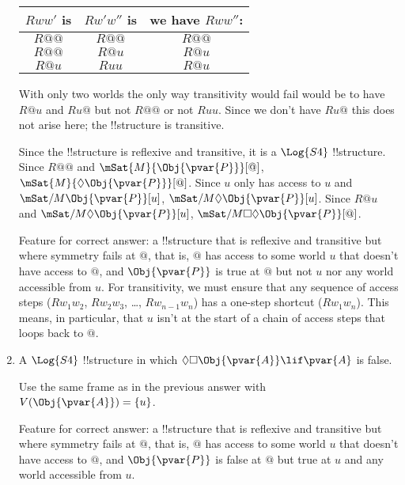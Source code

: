 \documentclass[../../../include/open-logic-section]{subfiles}
\begin{document}
\begin{prob}
\begin{ans}
\begin{enumerate}
        \smallskip
        \begin{tabular}{ccc}
            \hline
            $Rww'$ is & $Rw'w''$ is     & we have $Rww''$: \\
            \hline
            $R@@$ & $R@@$ & $R@@$ \\
            $R@@$ & $R@u$ & $R@u$ \\
            $R@u$  & $Ruu$ & $R@u$ \\
            \hline
        \end{tabular}
        \smallskip

        With only two worlds the only way transitivity would fail 
        would be to have $R@u$ and $Ru@$ but not $R@@$ or not $Ruu$.
        Since we don't have $Ru@$ this does not arise here; 
        the !!{structure} is transitive. 

        Since the !!{structure} is reflexive and transitive, it is a
        $\Log{S4}$ !!{structure}. Since $R@@$ and
        $\mSat{M}{\Obj{\pvar{P}}}[@]$,
        $\mSat{M}{\Diamond\Obj{\pvar{P}}}[@]$. Since $u$ only has 
        access to $u$ and $\mSat/{M}{\Obj{\pvar{P}}}[u]$,
        $\mSat/{M}{\Diamond\Obj{\pvar{P}}}[u]$. Since $R@u$ and 
        $\mSat/{M}{\Diamond\Obj{\pvar{P}}}[u]$, 
        $\mSat/{M}{\Box\Diamond\Obj{\pvar{P}}}[@]$.
        
        Feature for correct answer: a !!{structure} that is reflexive
        and transitive but where symmetry fails at $@$, that is, $@$
        has access to some world $u$ that doesn't have access to $@$,
        and $\Obj{\pvar{P}}$ is true at $@$ but not $u$ nor any world
        accessible from $u$. For transitivity, we must ensure that any
        sequence of access steps ($Rw_1w_2$, $Rw_2w_3$, \dots,
        $Rw_{n-1}w_n$) has a one-step shortcut ($Rw_1w_n$). This
        means, in particular, that $u$ isn't at the start of a chain
        of access steps that loops back to $@$.  

        \item A $\Log{S4}$ !!{structure} in which
        $\Diamond\Box\Obj{\pvar{A}}\lif\pvar{A}$ is false.

        Use the same frame as in the previous answer with
        $V(\Obj{\pvar{A}})=\{u\}$.

        Feature for correct answer: a !!{structure} that is reflexive
        and transitive but where symmetry fails at $@$, that is, $@$
        has access to some world $u$ that doesn't have access to $@$,
        and $\Obj{\pvar{P}}$ is false at $@$ but true at $u$ and any
        world accessible from $u$.


\end{enumerate}
\end{ans}
\end{prob}
\end{document}
